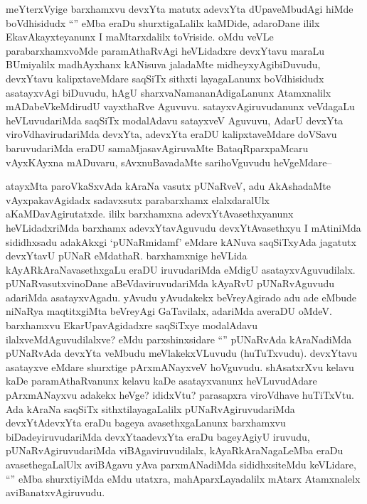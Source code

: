 
\begin{artha}
meYterxVyige barxhamxvu devxYta matutx adevxYta dUpaveMbudAgi hiMde boVdhisidudx ``\stext'' eMba eraDu shurxtigaLalilx kaMDide, adaroDane ililx EkavAkayxteyanunx I maMtarxdalilx toVriside. oMdu veVLe parabarxhamxvoMde paramAthaRvAgi heVLidadxre devxYtavu maraLu BUmiyalilx madhAyxhanx kANisuva jaladaMte midheyxyAgibiDuvudu, devxYtavu kalipxtaveMdare saqSiTx sithxti layagaLanunx boVdhisidudx asatayxvAgi biDuvudu, hAgU sharxvaNamananAdigaLanunx Atamxnalilx mADabeVkeMdirudU vayxthaRve Aguvuvu. satayxvAgiruvudanunx veVdagaLu heVLuvudariMda saqSiTx modalAdavu satayxveV Aguvuvu, AdarU devxYta viroVdhavirudariMda devxYta, adevxYta eraDU kalipxtaveMdare doVSavu baruvudariMda eraDU samaMjasavAgiruvaMte BataqRparxpaMcaru vAyxKAyxna mADuvaru, sAvxnuBavadaMte sarihoVguvudu heVgeMdare--
\end{artha}

\begin{artha}
atayxMta paroVkaSxvAda kAraNa vasutx pUNaRveV, adu AkAshadaMte vAyxpakavAgidadx sadavxsutx parabarxhamx elalxdaralUlx aKaMDavAgirutatxde. ililx barxhamxna adevxYtAvasethxyanunx heVLidadxriMda barxhamx adevxYtavAguvudu devxYtAvasethxyu I mAtiniMda sididhxsadu adakAkxgi `pUNaRmidamf' eMdare kANuva saqSiTxyAda jagatutx devxYtavU pUNaR eMdathaR. barxhamxnige heVLida kAyARkAraNavasethxgaLu eraDU iruvudariMda eMdigU asatayxvAguvudilalx. pUNaRvasutxvinoDane aBeVdaviruvudariMda kAyaRvU pUNaRvAguvudu adariMda asatayxvAgadu. yAvudu yAvudakekx beVreyAgirado adu ade eMbude niNaRya maqtitxgiMta beVreyAgi GaTavilalx, adariMda averaDU oMdeV. barxhamxvu EkarUpavAgidadxre saqSiTxye modalAdavu ilalxveMdAguvudilalxve? eMdu parxshinxsidare ``\stext'' pUNaRvAda kAraNadiMda pUNaRvAda devxYta veMbudu meVlakekxVLuvudu (huTuTxvudu). devxYtavu asatayxve eMdare shurxtige pArxmANayxveV hoVguvudu. shAsatxrXvu kelavu kaDe paramAthaRvanunx kelavu kaDe asatayxvanunx heVLuvudAdare pArxmANayxvu adakekx heVge? ididxVtu? parasapxra viroVdhave huTiTxVtu. Ada kAraNa saqSiTx sithxtilayagaLalilx pUNaRvAgiruvudariMda devxYtAdevxYta eraDu bageya avasethxgaLanunx barxhamxvu biDadeyiruvudariMda devxYtaadevxYta eraDu bageyAgiyU iruvudu, pUNaRvAgiruvudariMda viBAgaviruvudilalx, kAyaRkAraNagaLeMba eraDu avasethegaLalUlx aviBAgavu yAva parxmANadiMda sididhxsiteMdu keVLidare, ``\stext'' eMba shurxtiyiMda eMdu utatxra, mahAparxLayadalilx mAtarx Atamxnalelx aviBanatxvAgiruvudu.
\end{artha}

